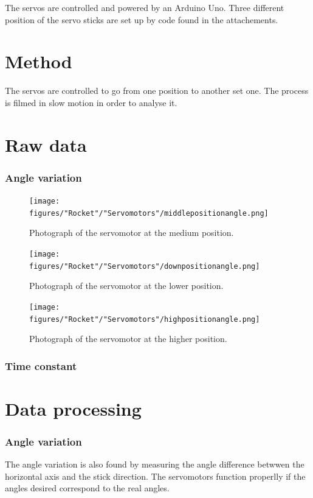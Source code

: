 The servos are controlled and powered by an Arduino Uno. Three different position of the servo sticks are set up by code found in the attachements.




	\section*{Method}
 The servos are controlled to go from one position to another set one. The process is filmed in slow motion in order to analyse it. 




	\section*{Raw data}
	
		\subsubsection*{Angle variation}

\begin{figure} [htbp]
	\centering
	\texttt{[image: figures/"Rocket"/"Servomotors"/middlepositionangle.png]}
	\caption{Photograph of the servomotor at the medium position.} \label{fig:ServoInitialPosition}
\end{figure}

\begin{figure} [htbp]
	\centering
	\texttt{[image: figures/"Rocket"/"Servomotors"/downpositionangle.png]}
	\caption{Photograph of the servomotor at the lower position.} \label{fig:ServoLowPosition}
\end{figure}

\begin{figure} [htbp]
	\centering
	\texttt{[image: figures/"Rocket"/"Servomotors"/highpositionangle.png]}
	\caption{Photograph of the servomotor at the higher position.} \label{fig:ServoHighPosition}
\end{figure}

		\subsubsection*{Time constant}




	\section*{Data processing}	
\subsubsection*{Angle variation}
The angle variation is also found by measuring the angle difference betwwen the horizontal axis and the stick direction. The servomotors function properlly if the angles desired correspond to the real angles.
